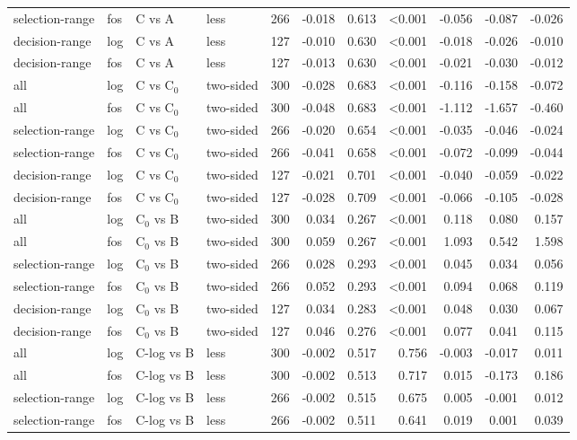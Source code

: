 \begin{longtable}{llllrrrrrrr}
selection-range & fos & C vs A & less & 266 & -0.018 & 0.613 & <0.001 & -0.056 & -0.087 & -0.026 \\
decision-range & log & C vs A & less & 127 & -0.010 & 0.630 & <0.001 & -0.018 & -0.026 & -0.010 \\
decision-range & fos & C vs A & less & 127 & -0.013 & 0.630 & <0.001 & -0.021 & -0.030 & -0.012 \\
all & log & C vs C$_0$ & two-sided & 300 & -0.028 & 0.683 & <0.001 & -0.116 & -0.158 & -0.072 \\
all & fos & C vs C$_0$ & two-sided & 300 & -0.048 & 0.683 & <0.001 & -1.112 & -1.657 & -0.460 \\
selection-range & log & C vs C$_0$ & two-sided & 266 & -0.020 & 0.654 & <0.001 & -0.035 & -0.046 & -0.024 \\
selection-range & fos & C vs C$_0$ & two-sided & 266 & -0.041 & 0.658 & <0.001 & -0.072 & -0.099 & -0.044 \\
decision-range & log & C vs C$_0$ & two-sided & 127 & -0.021 & 0.701 & <0.001 & -0.040 & -0.059 & -0.022 \\
decision-range & fos & C vs C$_0$ & two-sided & 127 & -0.028 & 0.709 & <0.001 & -0.066 & -0.105 & -0.028 \\
all & log & C$_0$ vs B & two-sided & 300 & 0.034 & 0.267 & <0.001 & 0.118 & 0.080 & 0.157 \\
all & fos & C$_0$ vs B & two-sided & 300 & 0.059 & 0.267 & <0.001 & 1.093 & 0.542 & 1.598 \\
selection-range & log & C$_0$ vs B & two-sided & 266 & 0.028 & 0.293 & <0.001 & 0.045 & 0.034 & 0.056 \\
selection-range & fos & C$_0$ vs B & two-sided & 266 & 0.052 & 0.293 & <0.001 & 0.094 & 0.068 & 0.119 \\
decision-range & log & C$_0$ vs B & two-sided & 127 & 0.034 & 0.283 & <0.001 & 0.048 & 0.030 & 0.067 \\
decision-range & fos & C$_0$ vs B & two-sided & 127 & 0.046 & 0.276 & <0.001 & 0.077 & 0.041 & 0.115 \\
all & log & C-log vs B & less & 300 & -0.002 & 0.517 & 0.756 & -0.003 & -0.017 & 0.011 \\
all & fos & C-log vs B & less & 300 & -0.002 & 0.513 & 0.717 & 0.015 & -0.173 & 0.186 \\
selection-range & log & C-log vs B & less & 266 & -0.002 & 0.515 & 0.675 & 0.005 & -0.001 & 0.012 \\
selection-range & fos & C-log vs B & less & 266 & -0.002 & 0.511 & 0.641 & 0.019 & 0.001 & 0.039 \\

\end{longtable}
